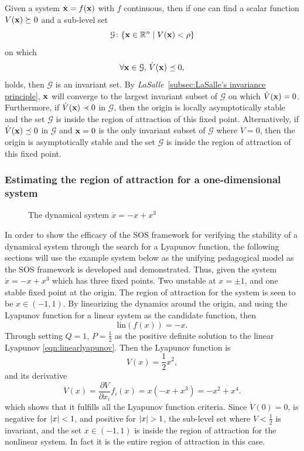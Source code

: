 \begin{theorem}
  Given a system \(\dot{\mathbf{x}} = f(\mathbf{x})\) with \(f\) continuous, then if
  one can find a scalar function \(V(\mathbf{x}) \succeq 0 \) and a sub-level set
  \[
    \mathcal{G} \colon \lbrace\mathbf{x} \in \mathbb{R}^n \mid V(\mathbf{x}) < \rho\rbrace
  \]
  on which
  \[
    \forall \mathbf{x} \in \mathcal{G},\,\dot{V}(\mathbf{x}) \preceq 0,
  \]
  holds, then \(\mathcal{G}\) is an invariant set. By
  \textit{LaSalle}~\ref{subsec:LaSalle's invariance principle}, \(\mathbf{x}\)
  will converge to the largest invariant subset of \(\mathcal{G}\) on which
  \(\dot{V}(\mathbf{x}) = 0\). Furthermore, if \(\dot{V}(\mathbf{x}) \prec 0\) in
  \(\mathcal{G}\), then the origin is locally asymptotically stable and the set
  \(\mathcal{G}\) is inside the region of attraction of this fixed point.
  Alternatively, if \(\dot{V}(\mathbf{x}) \preceq 0 \) in \(\mathcal{G}\) and
  \(\mathbf{x} = 0\) is the only invariant subset of \(\mathcal{G}\) where
  \(\dot{V} = 0\), then the origin is asymptotically stable and the set
  \(\mathcal{G}\) is inside the region of attraction of this fixed point.
\end{theorem}

\subsubsection{Estimating the region of attraction for a one-dimensional system}
\label{subsec:Estimating the region of attraction for a one-dimensional system}

\begin{figure}
  \centering 
  \caption{The dynamical system \(\dot{x} = -x + x^3\)}
\end{figure}

In order to show the efficacy of the \ac{SOS} framework for verifying the
stability of a dynamical system through the search for a Lyapunov function, the
following sections will use the example system below as the unifying pedagogical
model as the \ac{SOS} framework is developed and demonstrated. Thus, given the
system \(\dot{x} = -x + x^3\) which has three fixed points. Two unstable at \(x
= \pm 1\), and one stable fixed point at the origin. The region of attraction
for the system is seen to be \(x \in \left( -1, 1 \right)\). By linearizing the
dynamics around the origin, and using the Lyapunov function for a linear system
as the candidate function, then
\[
  \text{lin}(f(x)) = -x.
\]
Through setting \(Q=1\), \(P=\frac{1}{2}\) as the positive definite solution to
the linear Lyapunov \cref{eqn:linearlyapunov}. Then the Lyapunov function is
\[
  V(x) = \frac{1}{2}x^2,
\]
and its derivative
\[
  \dot{V}(x) = \frac{\partial V}{\partial x_i} f_i(x) = x(-x + x^3) = -x^2 +
  x^4.
\]
which shows that it fulfills all the Lyapunov function criteria. Since
\(\dot{V}(0) = 0\), is negative for \(\lvert x\rvert<1\), and positive for \(\lvert x\rvert >
1\), the sub-level set where \(V < \frac{1}{2}\) is invariant, and the set \(x
\in \left( -1, 1 \right)\) is inside the region of attraction for the nonlinear
system. In fact it is the entire region of attraction in this case.

